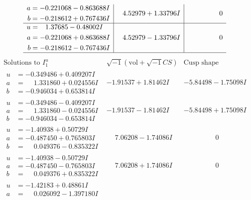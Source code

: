 \documentclass[1p]{elsarticle_modified}
\theoremstyle{definition}
\newcommand{\I}{\sqrt{-1}}
\begin{document}
$$\begin{array}{c|c|c}
\begin{aligned}
a &= -0.221068 - 0.863688 I \\
b &= -0.218612 + 0.767436 I\end{aligned}
 & \phantom{-}4.52979 + 1.33796 I & \phantom{-0.000000 } 0 \\ \hline\begin{aligned}
u &= \phantom{-}1.37685 - 0.48002 I \\
a &= -0.221068 + 0.863688 I \\
b &= -0.218612 - 0.767436 I\end{aligned}
 & \phantom{-}4.52979 - 1.33796 I & \phantom{-0.000000 } 0\\
 \hline 
 \end{array}$$\newpage$$\begin{array}{c|c|c}  
\text{Solutions to }I^u_{1}& \I (\text{vol} + \sqrt{-1}CS) & \text{Cusp shape}\\
 \hline 
\begin{aligned}
u &= -0.349486 + 0.409207 I \\
a &= \phantom{-}1.331860 + 0.024556 I \\
b &= -0.946034 + 0.653814 I\end{aligned}
 & -1.91537 + 1.81462 I & -5.84498 - 1.75098 I \\ \hline\begin{aligned}
u &= -0.349486 - 0.409207 I \\
a &= \phantom{-}1.331860 - 0.024556 I \\
b &= -0.946034 - 0.653814 I\end{aligned}
 & -1.91537 - 1.81462 I & -5.84498 + 1.75098 I \\ \hline\begin{aligned}
u &= -1.40938 + 0.50729 I \\
a &= -0.487450 + 0.765803 I \\
b &= \phantom{-}0.049376 - 0.835322 I\end{aligned}
 & \phantom{-}7.06208 - 1.74086 I & \phantom{-0.000000 } 0 \\ \hline\begin{aligned}
u &= -1.40938 - 0.50729 I \\
a &= -0.487450 - 0.765803 I \\
b &= \phantom{-}0.049376 + 0.835322 I\end{aligned}
 & \phantom{-}7.06208 + 1.74086 I & \phantom{-0.000000 } 0 \\ \hline\begin{aligned}
u &= -1.42183 + 0.48861 I \\
a &= \phantom{-}0.026092 - 1.397180 I \\

\end{aligned}
\end{array}$$
\end{document}
